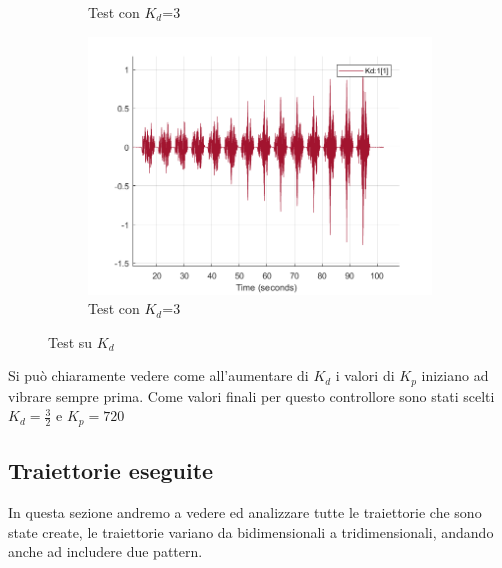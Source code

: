 \begin{figure}[!ht]
\begin{subfigure}{.5\textwidth}
  \caption{Test con $K_d$=3}
  \label{fig:sub-kd3}
\end{subfigure}
\begin{subfigure}{.5\textwidth}
  \centering
  \includegraphics[width=.8\linewidth]{Immagini/Sperimentale/Test_Kd=3.png}  
  \caption{Test con $K_d$=3}
  \label{fig:sub-kd1}
\end{subfigure}
\caption{Test su $K_d$}
\end{figure}
Si può chiaramente vedere come all'aumentare di $K_d$ i valori di $K_p$ iniziano ad vibrare sempre prima. Come valori finali per questo controllore sono stati scelti $K_d = \frac{3}{2}$ e $K_p = 720$
\subsection{Traiettorie eseguite}
In questa sezione andremo a vedere ed analizzare tutte le traiettorie che sono state create, le traiettorie variano da bidimensionali a tridimensionali, andando anche ad includere due pattern.